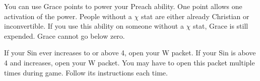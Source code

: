 \documentclass[green]{airship}
\begin{document}
\begin{enum}

\item You can use Grace points to power your Preach ability. One point allows one activation of the power. People without a $\chi$ stat are either already Christian or inconvertible. If you use this ability on someone without a $\chi$ stat, Grace is still expended. Grace cannot go below zero.

\item If your Sin ever increases to or above 4, open your W packet. If your Sin is above 4 and increases, open your W packet. You may have to open this packet multiple times during game. Follow its instructions each time. 
\end{enum}
\end{document}
